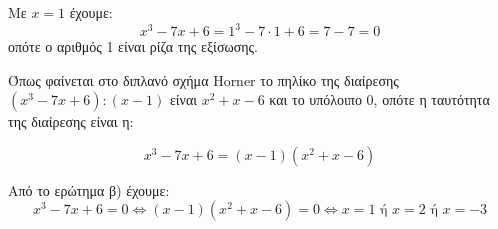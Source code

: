 \begin{alist}
\item Με $x = 1$ έχουμε:
\[x^3 - 7x + 6 = 1^3 - 7 \cdot 1 + 6 = 7 - 7 = 0\]
οπότε ο αριθμός 1 είναι ρίζα της εξίσωσης.
\item Όπως φαίνεται στο διπλανό σχήμα Horner το πηλίκο της διαίρεσης $(x^3 - 7x + 6) : (x - 1)$ είναι $x^2 + x - 6$ και το υπόλοιπο $0$, οπότε η ταυτότητα της διαίρεσης είναι η:
\begin{center}
\end{center}
\[x^3 - 7x + 6 = (x - 1)(x^2 + x - 6)\]
\vspace{0.5cm}
\item Από το ερώτημα β) έχουμε:
\[x^3 - 7x + 6 = 0 \Leftrightarrow (x - 1)(x^2 + x - 6) = 0 \Leftrightarrow x = 1 \text{ ή } x = 2 \text{ ή } x = -3\]
\end{alist}

